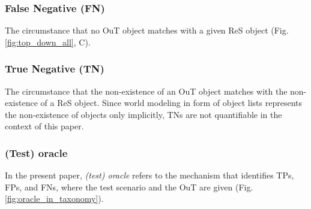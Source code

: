 \documentclass[conference]{IEEEtran}
\begin{document}
\subsubsection{False Negative (FN)} \label{def:fn} The circumstance that no OuT object matches with a given ReS object (Fig. \ref{fig:top_down_all}, C).

\subsubsection{True Negative (TN)} \label{def:tn} The circumstance that the non-existence of an OuT object matches with the non-existence of a ReS object. Since world modeling in form of object lists represents the non-existence of objects only implicitly, TNs are not quantifiable in the context of this paper.








\subsubsection{(Test) oracle} \label{def:oracle} 
In the present paper, \textit{(test) oracle} refers to the mechanism that identifies TPs, FPs, and FNs, where the test scenario and the OuT are given (Fig. \ref{fig:oracle_in_taxonomy}).
\end{document}
